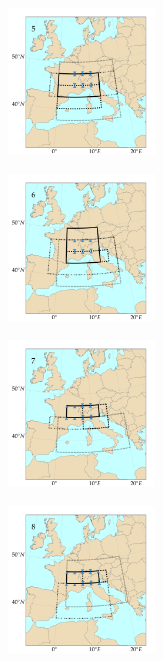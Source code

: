 \documentclass[twocol]{ametsoc}
\begin{document}
\begin{figure}[htb]
	\begin{subfigure}{.5\columnwidth}
		\centering
		\includegraphics[width=3.9cm]{figures/spatial_win_z4-hi2/Spatial_windows_5.png}
	\end{subfigure}%
	\begin{subfigure}{.5\columnwidth}
		\centering
		\includegraphics[width=3.9cm]{figures/spatial_win_z4-hi2/Spatial_windows_6.png}
	\end{subfigure}
	\begin{subfigure}{.5\columnwidth}
		\centering
		\includegraphics[width=3.9cm]{figures/spatial_win_z4-hi2/Spatial_windows_7.png}
	\end{subfigure}%
	\begin{subfigure}{.5\columnwidth}
		\centering
		\includegraphics[width=3.9cm]{figures/spatial_win_z4-hi2/Spatial_windows_8.png}
	\end{subfigure}
	\begin{subfigure}{.5\columnwidth}

\end{subfigure}
\end{figure}
\end{document}
